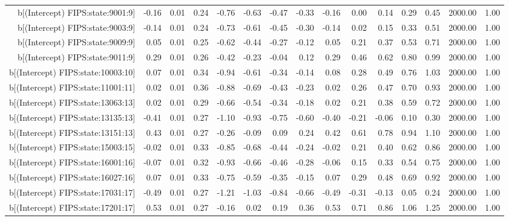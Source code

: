 \begin{table}[ht]
\begin{tabular}{rrrrrrrrrrrrrrr}
  b[(Intercept) FIPS:state:9001:9] & -0.16 & 0.01 & 0.24 & -0.76 & -0.63 & -0.47 & -0.33 & -0.16 & 0.00 & 0.14 & 0.29 & 0.45 & 2000.00 & 1.00 \\ 
  b[(Intercept) FIPS:state:9003:9] & -0.14 & 0.01 & 0.24 & -0.73 & -0.61 & -0.45 & -0.30 & -0.14 & 0.02 & 0.15 & 0.33 & 0.51 & 2000.00 & 1.00 \\ 
  b[(Intercept) FIPS:state:9009:9] & 0.05 & 0.01 & 0.25 & -0.62 & -0.44 & -0.27 & -0.12 & 0.05 & 0.21 & 0.37 & 0.53 & 0.71 & 2000.00 & 1.00 \\ 
  b[(Intercept) FIPS:state:9011:9] & 0.29 & 0.01 & 0.26 & -0.42 & -0.23 & -0.04 & 0.12 & 0.29 & 0.46 & 0.62 & 0.80 & 0.99 & 2000.00 & 1.00 \\ 
  b[(Intercept) FIPS:state:10003:10] & 0.07 & 0.01 & 0.34 & -0.94 & -0.61 & -0.34 & -0.14 & 0.08 & 0.28 & 0.49 & 0.76 & 1.03 & 2000.00 & 1.00 \\ 
  b[(Intercept) FIPS:state:11001:11] & 0.02 & 0.01 & 0.36 & -0.88 & -0.69 & -0.43 & -0.23 & 0.02 & 0.26 & 0.47 & 0.70 & 0.93 & 2000.00 & 1.00 \\ 
  b[(Intercept) FIPS:state:13063:13] & 0.02 & 0.01 & 0.29 & -0.66 & -0.54 & -0.34 & -0.18 & 0.02 & 0.21 & 0.38 & 0.59 & 0.72 & 2000.00 & 1.00 \\ 
  b[(Intercept) FIPS:state:13135:13] & -0.41 & 0.01 & 0.27 & -1.10 & -0.93 & -0.75 & -0.60 & -0.40 & -0.21 & -0.06 & 0.10 & 0.30 & 2000.00 & 1.00 \\ 
  b[(Intercept) FIPS:state:13151:13] & 0.43 & 0.01 & 0.27 & -0.26 & -0.09 & 0.09 & 0.24 & 0.42 & 0.61 & 0.78 & 0.94 & 1.10 & 2000.00 & 1.00 \\ 
  b[(Intercept) FIPS:state:15003:15] & -0.02 & 0.01 & 0.33 & -0.85 & -0.68 & -0.44 & -0.24 & -0.02 & 0.21 & 0.40 & 0.62 & 0.86 & 2000.00 & 1.00 \\ 
  b[(Intercept) FIPS:state:16001:16] & -0.07 & 0.01 & 0.32 & -0.93 & -0.66 & -0.46 & -0.28 & -0.06 & 0.15 & 0.33 & 0.54 & 0.75 & 2000.00 & 1.00 \\ 
  b[(Intercept) FIPS:state:16027:16] & 0.07 & 0.01 & 0.33 & -0.75 & -0.59 & -0.35 & -0.15 & 0.07 & 0.29 & 0.48 & 0.69 & 0.92 & 2000.00 & 1.00 \\ 
  b[(Intercept) FIPS:state:17031:17] & -0.49 & 0.01 & 0.27 & -1.21 & -1.03 & -0.84 & -0.66 & -0.49 & -0.31 & -0.13 & 0.05 & 0.24 & 2000.00 & 1.00 \\ 
  b[(Intercept) FIPS:state:17201:17] & 0.53 & 0.01 & 0.27 & -0.16 & 0.02 & 0.19 & 0.36 & 0.53 & 0.71 & 0.86 & 1.06 & 1.25 & 2000.00 & 1.00 \\ 

\end{tabular}
\end{table}
